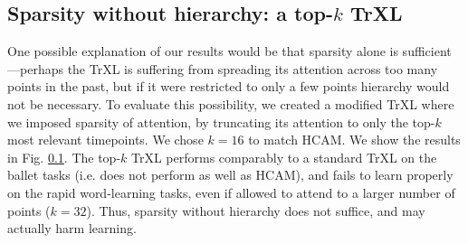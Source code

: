 \subsection{Sparsity without hierarchy: a top-\(k\) TrXL} \label{app:supp_exp:topk_trxl}
One possible explanation of our results would be that sparsity alone is sufficient---perhaps the TrXL is suffering from spreading its attention across too many points in the past, but if it were restricted to only a few points hierarchy would not be necessary. To evaluate this possibility, we created a modified TrXL where we imposed sparsity of attention, by truncating its attention to only the top-\(k\) most relevant timepoints. We chose \(k=16\) to match HCAM. We show the results in Fig. \ref{app:supp_exp:topk_trxl}. The top-\(k\) TrXL performs comparably to a standard TrXL on the ballet tasks (i.e. does not perform as well as HCAM), and fails to learn properly on the rapid word-learning tasks, even if allowed to attend to a larger number of points (\(k=32\)). Thus, sparsity without hierarchy does not suffice, and may actually harm learning.
